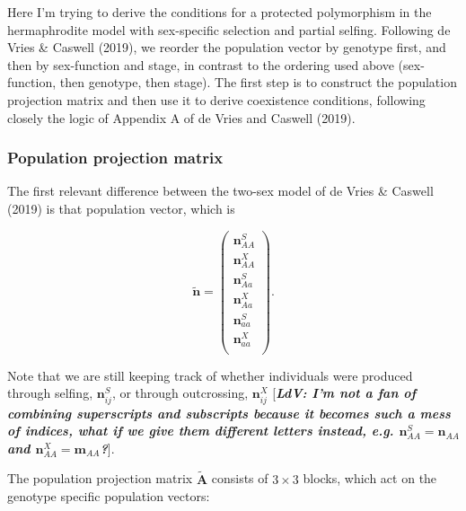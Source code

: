 \documentclass[11pt]{article}
\def\mbf#1{\mathbf{#1}}
\begin{document}
Here I'm trying to derive the conditions for a protected polymorphism in the hermaphrodite model with sex-specific selection and partial selfing. Following de Vries \& Caswell (2019), we reorder the population vector by genotype first, and then by sex-function and stage, in contrast to the ordering used above (sex-function, then genotype, then stage). The first step is to construct the population projection matrix and then use it to derive coexistence conditions, following closely the logic of Appendix A of de Vries and Caswell (2019).

\subsubsection*{Population projection matrix}

The first relevant difference between the two-sex model of de Vries \& Caswell (2019) is that population vector, which is 

\begin{equation}
	\tilde{\mbf{n}} = \left(
			\begin{array}{c}
							\mbf{n}^S_{AA} \\
							\mbf{n}^X_{AA} \\ \hline
							\mbf{n}^S_{Aa} \\
							\mbf{n}^X_{Aa} \\ \hline
							\mbf{n}^S_{aa} \\
							\mbf{n}^X_{aa} \\
			\end{array} \right).
\end{equation}

\noindent Note that we are still keeping track of whether individuals were produced through selfing, $\mbf{n}^S_{ij}$, or through outcrossing, $\mbf{n}^X_{ij}$ [\textit{\textbf{LdV: I'm not a fan of combining superscripts and subscripts because it becomes such a mess of indices, what if we give them different letters instead, e.g. $\mbf{n}^S_{AA}=\mbf{n}_{AA}$ and $\mbf{n}^X_{AA}=\mbf{m}_{AA}$?}}].

The population projection matrix $\tilde{\mbf{A}}$ consists of $3 \times 3$ blocks, which act on the genotype specific population vectors:
\end{document}
